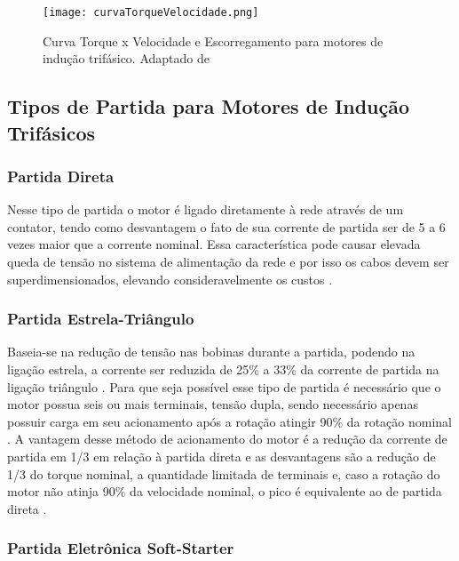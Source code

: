 			\begin{figure}[!h]
				\centering
				\texttt{[image: curvaTorqueVelocidade.png]}
				\caption[Curva Torque x Velocidade e Escorregamento para motores de indução trifásico]{Curva Torque x Velocidade e Escorregamento para motores de indução trifásico. Adaptado de \cite{FitzgeraldETAL}} 
				\label{curvaTorqueVelocidade}
			\end{figure}


		\subsection{Tipos de Partida para Motores de Indução Trifásicos}

			\subsubsection{Partida Direta}

				Nesse tipo de partida o motor é ligado diretamente à rede através de um contator, tendo como desvantagem o fato de sua corrente de partida ser de 5 a 6 vezes maior que a corrente nominal. Essa característica pode causar elevada queda de tensão no sistema de alimentação da rede e por isso os cabos devem ser superdimensionados, elevando consideravelmente os custos \cite{WEGMotorEletrico}. 


			\subsubsection{Partida Estrela-Triângulo}

				Baseia-se na redução de tensão nas bobinas durante a partida, podendo na ligação estrela, a corrente ser reduzida de 25\% a 33\% da corrente de partida na ligação triângulo \cite{WEGMotorEletrico}.  Para que seja possível esse tipo de partida é necessário que o motor possua seis ou mais terminais, tensão dupla, sendo necessário apenas possuir carga em seu acionamento após a rotação atingir 90\% da rotação nominal \cite{WEGMotorEletrico}\cite{Fitzgerald}. A vantagem desse método de acionamento do motor é a redução da corrente de partida em 1/3 em relação à partida direta e as desvantagens são a redução de 1/3 do torque nominal, a quantidade limitada de terminais e, caso a rotação do motor não atinja 90\% da velocidade nominal, o pico é equivalente ao de partida direta \cite{Alexander}.

			\subsubsection{Partida Eletrônica Soft-Starter}

